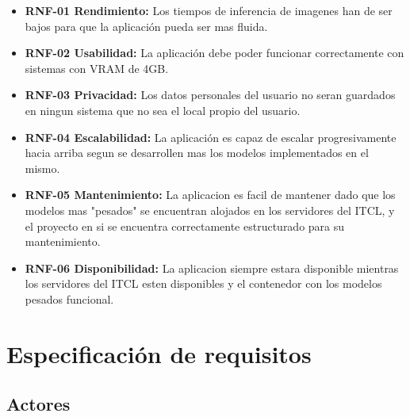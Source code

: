\begin{itemize}
    \item \textbf{RNF-01 Rendimiento:} Los tiempos de inferencia de imagenes han de ser bajos para que la aplicación pueda ser mas fluida.
    \item \textbf{RNF-02 Usabilidad:} La aplicación debe poder funcionar correctamente con sistemas con VRAM de 4GB.
    \item \textbf{RNF-03 Privacidad:} Los datos personales del usuario no seran guardados en ningun sistema que no sea el local propio del usuario.
    \item \textbf{RNF-04 Escalabilidad:} La aplicación es capaz de escalar progresivamente hacia arriba segun se desarrollen mas los modelos implementados en el mismo.
    \item \textbf{RNF-05 Mantenimiento:} La aplicacion es facil de mantener dado que los modelos mas "pesados" se encuentran alojados en los servidores del ITCL, y el proyecto en si se encuentra correctamente estructurado para su mantenimiento.
    \item \textbf{RNF-06 Disponibilidad:} La aplicacion siempre estara disponible mientras los servidores del ITCL esten disponibles y el contenedor con los modelos pesados funcional.
\end{itemize}


\section{Especificación de requisitos}
\subsection{Actores}


